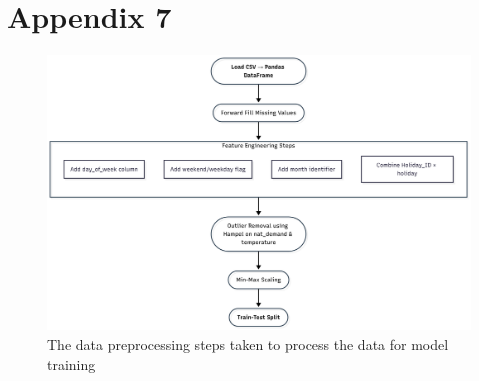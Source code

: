 \appendix 
\chapter{Appendix 7\label{sec:appendixA}}
\begin{figure}[htbp]
	\centering %
	\includegraphics[scale=0.1]{Chapters/images/preprocess.png}
	\caption{The data preprocessing steps taken to process the data for model training}
	\label{fig:preprocessing_steps_flowchart} %
\end{figure}



